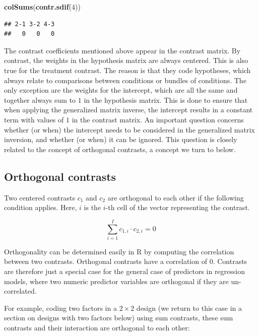 \documentclass[12pt,]{krantz}
\newenvironment{Shaded}{\begin{snugshade}}{\end{snugshade}}
\newcommand{\DecValTok}[1]{\textcolor[rgb]{0.00,0.00,0.81}{#1}}
\newcommand{\KeywordTok}[1]{\textcolor[rgb]{0.13,0.29,0.53}{\textbf{#1}}}
\newcommand{\NormalTok}[1]{#1}
\begin{document}
\begin{Shaded}
\begin{Highlighting}[]
\KeywordTok{colSums}\NormalTok{(}\KeywordTok{contr.sdif}\NormalTok{(}\DecValTok{4}\NormalTok{))}
\end{Highlighting}
\end{Shaded}

\begin{verbatim}
## 2-1 3-2 4-3 
##   0   0   0
\end{verbatim}

The contrast coefficients mentioned above appear in the contrast matrix. By contrast, the weights in the hypothesis matrix are always centered. This is also true for the treatment contrast. The reason is that they code hypotheses, which always relate to comparisons between conditions or bundles of conditions.
The only exception are the weights for the intercept, which are all the same and together always sum to \(1\) in the hypothesis matrix. This is done to ensure that when applying the generalized matrix inverse, the intercept results in a constant term with values of \(1\) in the contrast matrix.
An important question concerns whether (or when) the intercept needs to be considered in the generalized matrix inversion, and whether (or when) it can be ignored. This question is closely related to the concept of orthogonal contrasts, a concept we turn to below.

\hypertarget{orthogonal-contrasts}{%
\subsection{Orthogonal contrasts}\label{orthogonal-contrasts}}

Two centered contrasts \(c_1\) and \(c_2\) are orthogonal to each other if the following condition applies. Here, \(i\) is the \(i\)-th cell of the vector representing the contrast.

\begin{equation}
\sum_{i=1}^I c_{1,i} \cdot c_{2,i} = 0
\end{equation}

Orthogonality can be determined easily in R by computing the correlation between two contrasts. Orthogonal contrasts have a correlation of \(0\). Contrasts are therefore just a special case for the general case of predictors in regression models, where two numeric predictor variables are orthogonal if they are un-correlated.

For example, coding two factors in a \(2 \times 2\) design (we return to this case in a section on designs with two factors below) using sum contrasts, these sum contrasts and their interaction are orthogonal to each other:
\end{document}
